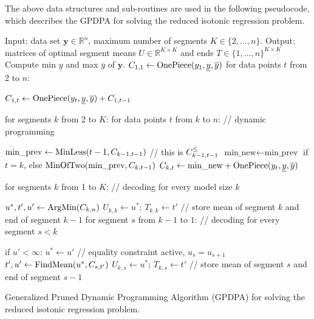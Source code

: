 \documentclass{article}
\newcommand{\RR}{\mathbb R}
\begin{document}
The above data structures and sub-routines are used in the following
pseudocode, which describes the GPDPA for solving the reduced
isotonic regression problem.
\begin{algorithm}[H]
\begin{algorithmic}[1]
\STATE Input: data set $\mathbf y\in\RR^n$, maximum number of segments $K\in\{2,\dots, n\}$.
\STATE Output: matrices of optimal segment means $U\in\RR^{K\times K}$ 
and ends $T\in\{1,\dots,n\}^{K\times K}$
\STATE Compute min $\underline y$ and max $\overline y$ of $\mathbf y$.
\label{line:min-max}
\STATE $C_{1,1}\gets \text{OnePiece}(y_1, \underline y, \overline y)$
\label{line:init-1}
\STATE for data points $t$ from 2 to $n$:
\begin{ALC@g}
  \STATE $C_{1,t}\gets \text{OnePiece}(y_t, \underline y, \overline y) + C_{1,t-1}$
\label{line:init-t}
\end{ALC@g}
\STATE for segments $k$ from 2 to $K$: for data points $t$ from $k$ to $n$: // dynamic programming
\label{line:for-k-t}
\begin{ALC@g}
  \STATE $\text{min\_prev}\gets \text{MinLess}(t-1, C_{k-1,t-1})$ // this is $C_{k-1,t-1}^\leq$
  \label{line:MinLess}
    \STATE $\text{min\_new}\gets\text{min\_prev}$ if $t=k$, 
else $\text{MinOfTwo}(\text{min\_prev}, C_{k, t-1})$
  \label{line:MinOfTwo}
  \STATE $C_{k,t}\gets \text{min\_new} + \text{OnePiece}(y_t, \underline y, \overline y)$
  \label{line:AddNew}
\end{ALC@g}
\STATE for segments $k$ from 1 to $K$: // decoding for every model size $k$
\label{line:for-k-decoding}
\begin{ALC@g}
  \STATE $u^*,t',u'\gets \text{ArgMin}(C_{k,n})$
  \label{line:ArgMin}
  \STATE $U_{k,k}\gets u^*;\, T_{k,k}\gets t'$ // store mean of segment $k$ and end of segment $k-1$
  \label{line:decode-kk}
  \STATE for segment $s$ from $k-1$ to $1$: // decoding for every segment $s<k$
  \label{line:for-s-decoding}
  \begin{ALC@g}
    \STATE if $u' < \infty$: $u^*\gets u'$ // equality constraint active, $u_s = u_{s+1}$
    \label{line:equality-constraint-active}
    \STATE $t',u'\gets\text{FindMean}(u^*, C_{s,t'})$
    \label{line:FindMean}
    \STATE $U_{k,s}\gets u^*;\, T_{k,s}\gets t'$ // store mean of segment $s$ and end of segment $s-1$
    \label{line:decode-ks}
  \end{ALC@g}
\end{ALC@g}
\caption{\label{algo:GPDPA}Generalized Pruned Dynamic Programming
  Algorithm (GPDPA) for solving the reduced isotonic regression
  problem.}
\end{algorithmic}
\end{algorithm}
\end{document}

